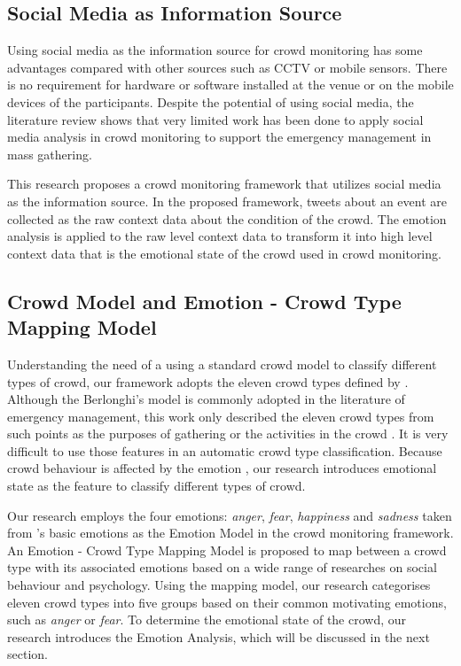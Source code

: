 \subsection{Social Media as Information Source}
Using social media as the information source for crowd monitoring has some advantages compared with other sources such as CCTV or mobile sensors. There is no requirement for hardware or software installed at the venue or on the mobile devices of the participants. Despite the potential of using social media, the literature review shows that very limited work has been done to apply social media analysis in crowd monitoring to support the emergency management in mass gathering.

This research proposes a crowd monitoring framework that utilizes social media as the information source. In the proposed framework, tweets about an event are collected as the raw context data about the condition of the crowd. The emotion analysis is applied to the raw level context data to transform it into high level context data that is the emotional state of the crowd used in crowd monitoring.

\subsection{Crowd Model and Emotion - Crowd Type Mapping Model}
Understanding the need of a using a standard crowd model to classify different types of crowd, our framework adopts the eleven crowd types defined by \citet{Berlonghi1995}. Although the Berlonghi's model is commonly adopted in the literature of emergency management, this work only described the eleven crowd types from such points as the purposes of gathering or the activities in the crowd \citep{Zeitz2009}. It is very difficult to use those features in an automatic crowd type classification. Because crowd behaviour is affected by the emotion \citep{Kornblum2011}, our research introduces emotional state as the feature to classify different types of crowd.

Our research employs the four emotions: \textit{anger}, \textit{fear}, \textit{happiness} and \textit{sadness} taken from \citet{ekman1971constants}'s basic emotions as the Emotion Model in the crowd monitoring framework. An Emotion - Crowd Type Mapping Model is proposed to map between a crowd type with its associated emotions based on a wide range of researches on social behaviour and psychology. Using the mapping model, our research categorises eleven crowd types into five groups based on their common motivating emotions, such as \textit{anger} or \textit{fear}. To determine the emotional state of the crowd, our research introduces the Emotion Analysis, which will be discussed in the next section.

